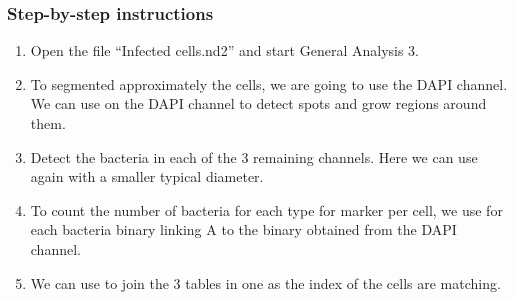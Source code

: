 \subsubsection*{Step-by-step instructions}
\begin{enumerate}
    \item Open the file ``Infected cells.nd2'' and start General Analysis 3.
    \item To segmented approximately the cells, we are going to use the DAPI channel. We can use   on the DAPI channel to detect spots and grow regions around them.
    \item Detect the bacteria in each of the 3 remaining channels. Here we can use again   with a smaller typical diameter.
    \item To count the number of bacteria for each type for marker per cell, we use  for each bacteria binary linking A to the binary obtained from the DAPI channel.
    \item We can use  to join the 3 tables in one as the index of the cells are matching.
\end{enumerate}


